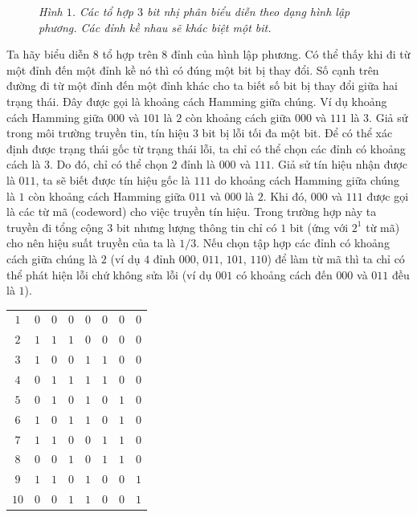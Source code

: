\begin{multicols}{2}
\begin{figure}[H]
		\vspace*{-5pt}
		\caption{\small\textit{\color{toanhocdoisong}Hình $1$. Các tổ hợp $3$ bit nhị phân biểu diễn theo dạng hình lập phương. Các đỉnh kề nhau sẽ khác biệt một bit.}}
		\vspace*{-10pt}
	\end{figure}
	Ta hãy biểu diễn $8$ tổ hợp trên $8$ đỉnh của hình lập phương. Có thể thấy khi đi từ một đỉnh đến một đỉnh kề nó thì có đúng một bit bị thay đổi. Số cạnh trên đường đi từ một đỉnh đến một đỉnh khác cho ta biết số bit bị thay đổi giữa hai trạng thái. Đây được gọi là khoảng cách Hamming giữa chúng. Ví dụ khoảng cách Hamming giữa $000$ và $101$ là $2$ còn khoảng cách giữa $000$ và $111$ là $3$.
	\vskip 0.05cm
	Giả sử trong môi trường truyền tin, tín hiệu $3$ bit bị lỗi tối đa một bit. Để có thể xác định được trạng thái gốc từ trạng thái lỗi, ta chỉ có thể chọn các đỉnh có khoảng cách là $3$. Do đó, chỉ có thể chọn $2$ đỉnh là $000$ và $111$. Giả sử tín hiệu nhận được là $011$, ta sẽ biết được tín hiệu gốc là $111$ do khoảng cách Hamming giữa chúng là $1$ còn khoảng cách Hamming giữa $011$ và $000$ là $2$. Khi đó, $000$ và $111$ được gọi là các từ mã (codeword) cho việc truyền tín hiệu. Trong trường hợp này ta truyền đi tổng cộng $3$ bit nhưng lượng thông tin chỉ có $1$ bit (ứng với $2^1$ từ mã) cho nên hiệu suất truyền của ta là $1/3$. Nếu chọn tập hợp các đỉnh có khoảng cách giữa chúng là $2$ (ví dụ $4$ đỉnh $000$, $011$, $101$, $110$) để làm từ mã thì ta chỉ có thể phát hiện lỗi chứ không sửa lỗi (ví dụ $001$ có khoảng cách đến $000$ và $011$ đều là $1$).
	\begin{table}[H]
		\vspace*{-5pt}
		\centering
		\captionsetup{labelformat= empty, justification=centering}
		\begin{tabular}{c c c c c c c c}
			\hline
			$1$ &$0$&$0$&$0$&$0$&$0$&$0$&$0$\\
			$2$ &$1$&$1$&$1$&$0$&$0$&$0$&$0$\\
			$3$ &$1$&$0$&$0$&$1$&$1$&$0$&$0$\\
			$4$ &$0$&$1$&$1$&$1$&$1$&$0$&$0$\\
			$5$ &$0$&$1$&$0$&$1$&$0$&$1$&$0$\\
			$6$ &$1$&$0$&$1$&$1$&$0$&$1$&$0$\\
			$7$ &$1$&$1$&$0$&$0$&$1$&$1$&$0$\\
			$8$ &$0$&$0$&$1$&$0$&$1$&$1$&$0$\\
			$9$ &$1$&$1$&$0$&$1$&$0$&$0$&$1$\\
			$10$ &$0$&$0$&$1$&$1$&$0$&$0$&$1$\\

\end{tabular}
\end{table}
\end{multicols}

